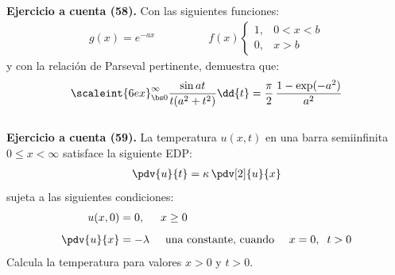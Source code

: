 \noindent
\textbf{Ejercicio a cuenta (58). } Con las siguientes funciones:
\begin{align*}
g(x) = e^{-a x} \hspace{2cm} f(x) \begin{cases}
1, & 0 < x < b \\
0, & x > b
\end{cases} 
\end{align*}
y con la relación de Parseval pertinente, demuestra que:
\begin{align*}
\scaleint{6ex}_{\bs 0}^{\infty} \dfrac{\sin a t}{t (a^{2} + t^{2})} \dd{t} = \dfrac{\pi}{2} \, \dfrac{1 - \exp(-a^{2})}{a^{2}}
\end{align*}
\\[0.5em]
\noindent
\textbf{Ejercicio a cuenta (59). } La temperatura $u(x, t)$ en una barra semiinfinita $0 \leq x < \infty$ satisface la siguiente EDP:
\begin{align*}
\pdv{u}{t} =\kappa \, \pdv[2]{u}{x}
\end{align*}
sujeta a las siguientes condiciones:
\begin{align*}
u(x, 0) &= 0, \hspace{0.5cm} x \geq 0 \\[0.5em]
\pdv{u}{x} &= - \lambda \hspace{0.5cm} \mbox{una constante, cuando \quad} x = 0, \hspace{0.2cm} t > 0  
\end{align*}
Calcula la temperatura para valores $x > 0$ y $t > 0$.
